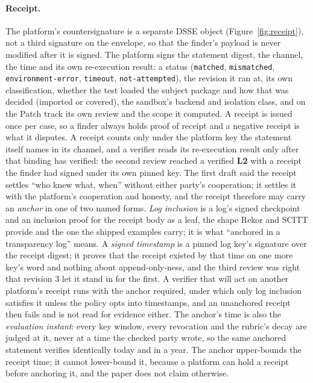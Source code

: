 \documentclass[11pt]{article}
\newcommand{\lvl}[1]{\textbf{L#1}}
\begin{document}
\paragraph{Receipt.} The platform's countersignature is a separate DSSE object (Figure~\ref{fig:receipt}), not a
third signature on the envelope, so that the finder's payload is never modified after it is signed. The platform
signs the statement digest, the channel, the time and its own re-execution result: a status (\texttt{matched},
\texttt{mismatched}, \texttt{environment-error}, \texttt{timeout}, \texttt{not-attempted}), the revision it ran
at, its own classification, whether the test loaded the subject package and how that was decided (imported or
covered), the sandbox's backend and isolation class, and on the Patch track its own review and the scope it
computed. A receipt is issued once per case, so a finder always holds proof of receipt and a negative receipt is
what it disputes. A receipt counts only under the platform key the statement itself names in its channel, and a
verifier reads its re-execution result only after that binding has verified: the second review reached a verified
\lvl{2} with a receipt the finder had signed under its own pinned key. The first draft said the receipt settles
``who knew what, when'' without either party's cooperation; it settles it with the platform's cooperation and
honesty, and the receipt therefore may carry an \emph{anchor} in one of two named forms. \emph{Log inclusion} is a
log's signed checkpoint and an inclusion proof for the receipt body as a leaf, the shape Rekor and SCITT provide and
the one the shipped examples carry; it is what ``anchored in a transparency log'' means. A \emph{signed timestamp} is
a pinned log key's signature over the receipt digest; it proves that the receipt existed by that time on one more
key's word and nothing about append-only-ness, and the third review was right that revision 3 let it stand in for
the first. A verifier that will act on another platform's receipt runs with the anchor required, under which only
log inclusion satisfies it unless the policy opts into timestamps, and an unanchored receipt then fails and is not
read for evidence either. The anchor's time is also the \emph{evaluation instant}: every key window, every
revocation and the rubric's decay are judged at it, never at a time the checked party wrote, so the same anchored
statement verifies identically today and in a year. The anchor upper-bounds the receipt time; it cannot lower-bound
it, because a platform can hold a receipt before anchoring it, and the paper does not claim otherwise.
\end{document}
